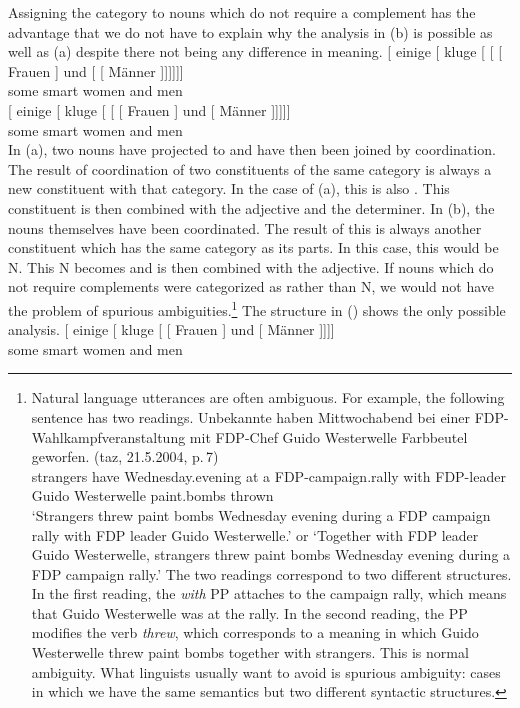 \largerpage[2]
Assigning the category \nbar to nouns which do not require a complement has the advantage that we do not have to explain why the analysis in (b) is possible as well
as (a) despite there not being any difference in meaning.
\eal
\ex 
\gll {}[ einige [\sub{\nbar} kluge [\sub{\nbar} [\sub{\nbar} [ Frauen ] und  [\sub{\nbar} [ Männer ]]]]]]\\
	 {}      some   {}           smart {}          {}           {}       women  {} and {} {}          men\\
\ex 
\gll {}[ einige [\sub{\nbar} kluge [\sub{\nbar} [ [ Frauen ] und [ Männer
]]]]]\\
	{}       some   {}           smart {}          {}       {}       women  {} and {} men\\
\zl
%
In (a), two nouns have projected to \nbar and have then been joined by coordination. The result of coordination
of two constituents of the same category is always a new constituent with that category. In the case of (a), this
is also \nbar. This constituent is then combined with the adjective and the determiner. In (b), the nouns themselves
have been coordinated. The result of this is always another constituent which has the same category as its parts. In this case,
this would be N. This N becomes \nbar and is then combined with the adjective. If nouns which do not require complements were
categorized as \nbar rather than N, we would not have the problem of spurious
ambiguities.\footnote{
Natural language utterances are often ambiguous. For example, the following sentence has two
readings.
\ea
\gll Unbekannte haben Mittwochabend bei einer FDP-Wahlkampfveranstaltung mit FDP-Chef Guido Westerwelle Farbbeutel geworfen. (taz, 21.5.2004, p.\,7)\\
     strangers  have  Wednesday.evening at a FDP-campaign.rally  with FDP-leader Guido Westerwelle
     paint.bombs thrown\\
\glt `Strangers threw paint bombs Wednesday evening during a FDP campaign rally with FDP leader
Guido Westerwelle.' or `Together with FDP leader Guido Westerwelle, strangers threw paint bombs Wednesday evening during a FDP campaign rally.'
\z
The two readings correspond to two different structures. In the first reading, the \emph{with} PP
attaches to the campaign rally, which means that Guido Westerwelle was at the rally. In the second
reading, the PP modifies the verb \emph{threw}, which corresponds to a meaning in which Guido
Westerwelle threw paint bombs together with strangers. This is normal ambiguity. What linguists
usually want to avoid is spurious ambiguity: cases in which we have the same semantics but two
different syntactic structures.
}
The structure in () shows the only possible analysis.
\ea
\gll {}[ einige [\sub{\nbar} kluge [\sub{\nbar} [\sub{\nbar} Frauen ] und [\sub{\nbar} Männer
]]]]\\
      {}	some    {}           smart {}          {}           women  {}  and {} men\\
\z

